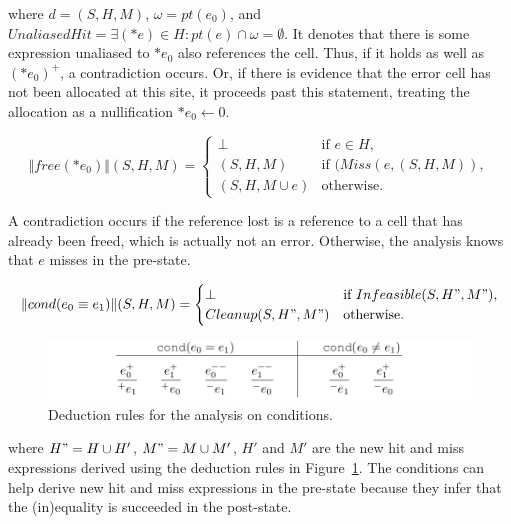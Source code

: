 where $d=(S,H,M)$, $\omega=pt(e_0)$, and 
$UnaliasedHit=\exists(*e)\in H:pt(e)\cap\omega =\emptyset$.
It denotes that there is some expression unaliased to $*e_0$ also 
references the cell. Thus, if it holds as well as $(*e_0)^+$, a contradiction
occurs. Or, if there is evidence that the error cell has not been 
allocated at this site, it proceeds past this statement, treating the 
allocation as a nullification $*e_0 \gets 0$.


\[
\Vert free(*e_0) \Vert(S,H,M)=\begin{cases}
\bot& \text{if $e \in H$},\\
(S,H,M)& \text{if $(Miss(e,(S,H,M))$},\\
(S,H,M\cup {e})& \text{otherwise}.
\end{cases}
\]

A contradiction occurs if the reference lost is a reference to a cell that has 
already been freed, which is actually not an error. Otherwise, the analysis 
knows that $e$ misses in the pre-state.


\[
\Vert cond(e_0\equiv e_1)\Vert(S,H,M)=\begin{cases}
\bot& \text{if $Infeasible(S,H",M")$},\\
Cleanup(S,H",M")& \text{otherwise}.
\end{cases}
\]

\begin{figure}
  \centering
  \includegraphics[width=1.0\columnwidth]{figs/rules_cond}
   \caption{Deduction rules for the analysis on conditions.}
   \label{fig:rule_cond}
\end{figure}

where $H"=H\cup H'$, $M"=M\cup M'$, $H'$ and $M'$ are the new hit and miss 
expressions derived using the deduction rules in Figure~\ref{fig:rule_cond}. 
The conditions can help derive new hit and miss expressions in the pre-state 
because they infer that the (in)equality is succeeded in the post-state.
